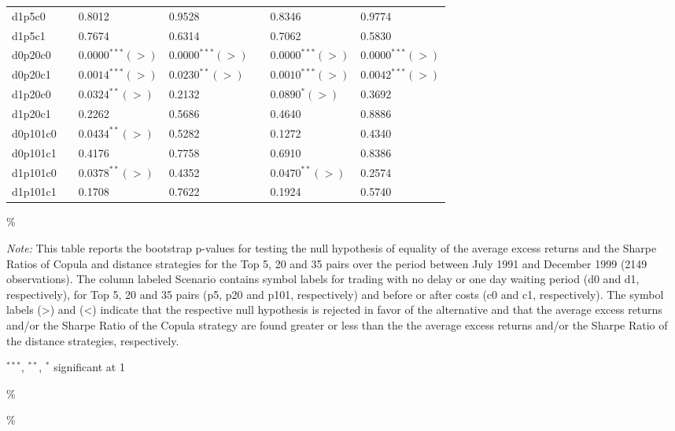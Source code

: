 \documentclass[a4paper]{article}
\begin{document}
\begin{threeparttable}[H]
\begin{tabularx}{\textwidth}{@{\extracolsep{\fill}}lllllll@{}}
		d1p5c0 & & 0.8012 & 0.9528 &       & 0.8346 & 0.9774 \\
		d1p5c1 & & 0.7674 & 0.6314 &       & 0.7062 & 0.5830 \\
		d0p20c0 & & $0.0000^{***}(>)$ & $0.0000^{***}(>)$ &       & $0.0000^{***}(>)$ & $0.0000^{***}(>)$ \\
		d0p20c1 & & $0.0014^{***}(>)$ & $0.0230^{**}(>)$ &       & $0.0010^{***}(>)$ & $0.0042^{***}(>)$ \\
		d1p20c0 & & $0.0324^{**}(>)$ & 0.2132 &       & $0.0890^{*}(>)$ & 0.3692 \\
		d1p20c1 & & 0.2262 & 0.5686 &       & 0.4640 & 0.8886 \\
		d0p101c0 & & $0.0434^{**}(>)$ & 0.5282 &       & 0.1272 & 0.4340 \\
		d0p101c1 & & 0.4176 & 0.7758 &       & 0.6910 & 0.8386 \\
		d1p101c0 & & $0.0378^{**}(>)$ & 0.4352 &       & $0.0470^{**}(>)$ & 0.2574 \\
		d1p101c1 & & 0.1708 & 0.7622 &       & 0.1924 & 0.5740 \\
		\bottomrule
	\end{tabularx}\%
	\begin{tablenotes}
		\item \textit{Note:} \scriptsize This table reports the bootstrap p-values for testing the null hypothesis of equality of the average excess returns and the Sharpe Ratios of Copula and distance strategies for the Top 5, 20 and 35 pairs over the period between July 1991 and December 1999 (2149 observations). The column labeled Scenario contains symbol labels for trading with no delay or one day waiting period (d0 and d1, respectively), for Top 5, 20 and 35 pairs (p5, p20 and p101, respectively) and before or after costs (c0 and c1, respectively). The symbol labels (>) and (<) indicate that the respective null hypothesis is rejected in favor of the alternative and that the average excess returns and/or the Sharpe Ratio of the Copula strategy are found greater or less than the the average excess returns and/or the Sharpe Ratio of the distance strategies, respectively.
		\item \scriptsize $^{\ast\ast\ast}$, $^{\ast\ast}$, $^{\ast}$  significant at 1\\%
	\end{tablenotes}
	\label{tab:table121}\%
\end{threeparttable}\%
\end{document}
